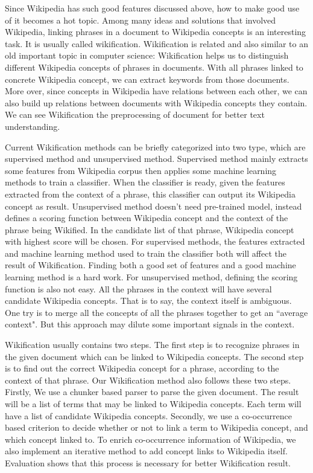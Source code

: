 {Since Wikipedia has such good features discussed above, how to make good use of it becomes
a hot topic. Among many ideas and solutions that involved Wikipedia, linking phrases in a
document to Wikipedia concepts is an interesting task. It is usually called wikification.
Wikification is related and also similar to an old important topic in computer science:
Wikification helps us to distinguish different Wikipedia concepts of phrases in documents. With
all phrases linked to concrete Wikipedia concept, we can extract keywords from those documents.
More over, since concepts in Wikipedia have relations between each other, we can also build up
relations between documents with Wikipedia concepts they contain. We can see Wikification the
preprocessing of document for better text understanding.

Current Wikification methods can be briefly categorized into two type, which are supervised method
and unsupervised method. Supervised method mainly extracts some features from Wikipedia corpus then
applies some machine learning methods to train a classifier. When the classifier is ready, given
the features extracted from the context of a phrase, this classifier can output its Wikipedia
concept as result. Unsupervised method doesn't need pre-trained model, instead defines a scoring
function between Wikipedia concept and the context of the phrase being Wikified. In the candidate
list of that phrase, Wikipedia concept with highest score will be chosen. For supervised methods,
the features extracted and machine learning method used to train the classifier both will affect
the result of Wikification. Finding both a good set of features and a good machine learning method
is a hard work. For unsupervised method, defining the scoring function is also not easy. All the
phrases in the context will have several candidate Wikipedia concepts. That is to say, the context
itself is ambiguous. One try is to merge all the concepts of all the phrases together to get an
``average context". But this approach may dilute some important signals in the context.

Wikification usually contains two steps. The first step is to recognize phrases in the given
document which can be linked to Wikipedia concepts. The second step is to find out the correct
Wikipedia concept for a phrase, according to the context of that phrase. Our Wikification method
also follows these two steps. Firstly, We use a chunker based parser to parse the given document.
The result will be a list of terms that may be linked to Wikipedia concepts. Each term will have
a list of candidate Wikipedia concepts. Secondly, we use a co-occurrence based criterion to decide
whether or not to link a term to Wikipedia concept, and which concept linked to. To enrich
co-occurrence information of Wikipedia, we also implement an iterative method to add concept links
to Wikipedia itself. Evaluation shows that this process is necessary for better Wikification result.
} %


